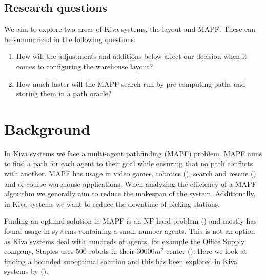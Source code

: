 \documentclass[a4paper,11pt]{article}
\begin{document}
\newpage
\subsection{Research questions}
We aim to explore two areas of Kiva systems, the layout and MAPF. These can be summarized in the following questions:

\begin{enumerate}
	\item How will the adjustments and additions below affect our decision when it comes to configuring the warehouse layout?

\item How much faster will the MAPF search run by pre-computing paths and storing them in a path oracle?

\end{enumerate}

\section{Background}
\label{background}

In Kiva systems we face a multi-agent pathfinding (MAPF) problem. MAPF aims to find a path for each agent to their goal while ensuring that no path conflicts with another. MAPF has usage in video games, robotics (\cite{bennewitz2002finding}), search and rescue (\cite{konolige2006centibots}) and of course warehouse applications. When analyzing the efficiency of a MAPF algorithm we generally aim to reduce the makespan of the system. Additionally, in Kiva systems we want to reduce the downtime of picking stations.

Finding an optimal solution in MAPF is an NP-hard problem (\cite{yu2013structure}) and mostly has found usage in systems containing a small number agents. This is not an option as Kiva systems deal with hundreds of agents, for example the Office Supply company, Staples uses 500 robots in their $30000m^{2}$ center (\cite{guizzo2008three}). Here we look at finding a bounded suboptimal solution and this has been explored in Kiva systems by (\cite{cohen2016bounded}).
\end{document}
